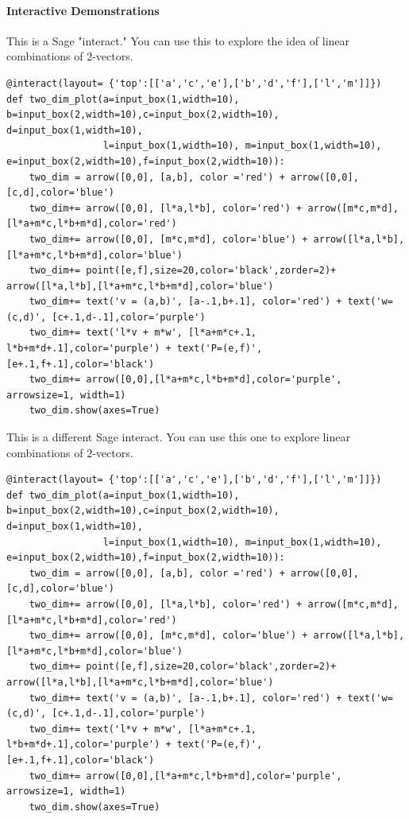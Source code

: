 \documentclass[10pt,]{book}
\theoremstyle{plain}
\theoremstyle{definition}
\numberwithin{equation}{section}
\begin{document}
\paragraph[Interactive Demonstrations]{Interactive Demonstrations}\label{paragraph-5}
This is a Sage "interact." You can use this to explore the idea of
            linear combinations of \(2\)-vectors.%
\begin{lstlisting}[style=sageinput]
@interact(layout= {'top':[['a','c','e'],['b','d','f'],['l','m']]})
def two_dim_plot(a=input_box(1,width=10), b=input_box(2,width=10),c=input_box(2,width=10), d=input_box(1,width=10),
                 l=input_box(1,width=10), m=input_box(1,width=10), e=input_box(2,width=10),f=input_box(2,width=10)):
    two_dim = arrow([0,0], [a,b], color ='red') + arrow([0,0],[c,d],color='blue')
    two_dim+= arrow([0,0], [l*a,l*b], color='red') + arrow([m*c,m*d],[l*a+m*c,l*b+m*d],color='red')
    two_dim+= arrow([0,0], [m*c,m*d], color='blue') + arrow([l*a,l*b],[l*a+m*c,l*b+m*d],color='blue')
    two_dim+= point([e,f],size=20,color='black',zorder=2)+ arrow([l*a,l*b],[l*a+m*c,l*b+m*d],color='blue')
    two_dim+= text('v = (a,b)', [a-.1,b+.1], color='red') + text('w=(c,d)', [c+.1,d-.1],color='purple')
    two_dim+= text('l*v + m*w', [l*a+m*c+.1, l*b+m*d+.1],color='purple') + text('P=(e,f)', [e+.1,f+.1],color='black')
    two_dim+= arrow([0,0],[l*a+m*c,l*b+m*d],color='purple', arrowsize=1, width=1)
    two_dim.show(axes=True)
\end{lstlisting}
\par
This is a different Sage interact. You can use this one to
                explore linear combinations of \(2\)-vectors.
\begin{lstlisting}[style=sageinput]
@interact(layout= {'top':[['a','c','e'],['b','d','f'],['l','m']]})
def two_dim_plot(a=input_box(1,width=10), b=input_box(2,width=10),c=input_box(2,width=10), d=input_box(1,width=10),
                 l=input_box(1,width=10), m=input_box(1,width=10), e=input_box(2,width=10),f=input_box(2,width=10)):
    two_dim = arrow([0,0], [a,b], color ='red') + arrow([0,0],[c,d],color='blue')
    two_dim+= arrow([0,0], [l*a,l*b], color='red') + arrow([m*c,m*d],[l*a+m*c,l*b+m*d],color='red')
    two_dim+= arrow([0,0], [m*c,m*d], color='blue') + arrow([l*a,l*b],[l*a+m*c,l*b+m*d],color='blue')
    two_dim+= point([e,f],size=20,color='black',zorder=2)+ arrow([l*a,l*b],[l*a+m*c,l*b+m*d],color='blue')
    two_dim+= text('v = (a,b)', [a-.1,b+.1], color='red') + text('w=(c,d)', [c+.1,d-.1],color='purple')
    two_dim+= text('l*v + m*w', [l*a+m*c+.1, l*b+m*d+.1],color='purple') + text('P=(e,f)', [e+.1,f+.1],color='black')
    two_dim+= arrow([0,0],[l*a+m*c,l*b+m*d],color='purple', arrowsize=1, width=1)
    two_dim.show(axes=True)
\end{lstlisting}
\end{document}

